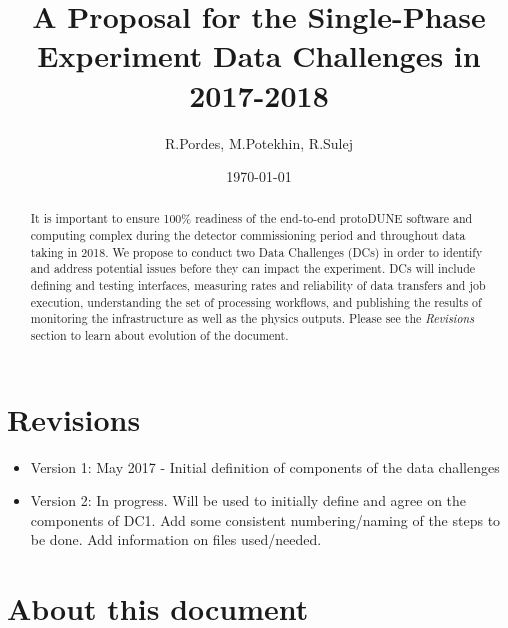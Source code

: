 \documentclass[pdftex,12pt,letter]{article}
\title{A Proposal for the Single-Phase \pd Experiment Data Challenges in 2017-2018}
\date{\today}
\author{R.Pordes, M.Potekhin, R.Sulej}
\newcommand{\pd}{protoDUNE\xspace}
\begin{document}
\maketitle

\begin{abstract}



\noindent It is important to ensure 100\% readiness of the
end-to-end \pd software and computing complex during the detector commissioning period and
throughout data taking in 2018. We propose to conduct two Data Challenges (DCs) in order to identify
and address potential issues before they can impact the experiment.
DCs will include defining and  testing interfaces, measuring rates and reliability of data transfers
and job execution, understanding the set of processing workflows, and publishing the results of monitoring
the infrastructure as well as the physics outputs.
Please see the \textit{Revisions} section to learn about evolution of the document.


\end{abstract}

\tableofcontents

\pagebreak

\section{Revisions}
\begin{itemize}

\item Version 1: May 2017 - Initial definition of components of the data challenges

\item Version 2: In progress. Will be used to initially define and agree on the components of DC1. Add some consistent numbering/naming of the steps to be done. Add information on files used/needed.

\end{itemize}

\section{About this document}
\end{document}
